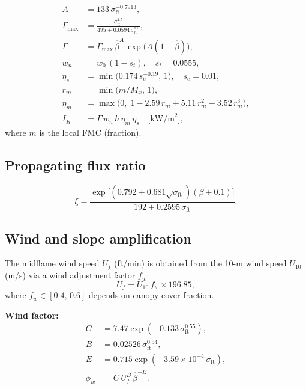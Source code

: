 \documentclass[11pt,twocolumn]{article}
\begin{document}
\begin{align}
  A &= 133\,\sigma_{\mathrm{ft}}^{-0.7913},\label{eq:A}\\
  \Gamma_{\max} &= \frac{\sigma_{\mathrm{ft}}^{1.5}}{495 + 0.0594\,\sigma_{\mathrm{ft}}^{1.5}},\label{eq:gammamax}\\
  \Gamma &= \Gamma_{\max}\,\hat{\beta}^{A}\,\exp\!\bigl(A(1-\hat{\beta})\bigr),\label{eq:gamma}\\
  w_n &= w_0\,(1 - s_t),\quad s_t = 0.0555,\label{eq:wn}\\
  \eta_s &= \min\!\bigl(0.174\,s_e^{-0.19},\,1\bigr),\quad s_e=0.01,\label{eq:etas}\\
  r_m &= \min\!\bigl(m/M_x,\,1\bigr),\label{eq:rm}\\
  \eta_m &= \max\!\bigl(0,\;1 - 2.59\,r_m + 5.11\,r_m^2 - 3.52\,r_m^3\bigr),\label{eq:etam}\\
  I_R &= \Gamma\,w_n\,h\,\eta_m\,\eta_s\quad\text{[kW/m}^2\text{]},\label{eq:IR}
\end{align}
where $m$ is the local FMC (fraction).

\subsection{Propagating flux ratio}

\begin{equation}
  \xi = \frac{\exp\!\bigl[(0.792+0.681\sqrt{\sigma_{\mathrm{ft}}})(\beta+0.1)\bigr]}
            {192 + 0.2595\,\sigma_{\mathrm{ft}}}.\label{eq:xi}
\end{equation}

\subsection{Wind and slope amplification}

The midflame wind speed $U_f$ (ft/min) is obtained from the 10-m
wind speed $U_{10}$ (m/s) via a wind adjustment factor $f_w$:
\begin{equation}
  U_f = U_{10}\,f_w\times 196.85,\label{eq:uf}
\end{equation}
where $f_w\in[0.4,\,0.6]$ depends on canopy cover fraction.

\textbf{Wind factor:}
\begin{align}
  C &= 7.47\exp(-0.133\,\sigma_{\mathrm{ft}}^{0.55}),\label{eq:C}\\
  B &= 0.02526\,\sigma_{\mathrm{ft}}^{0.54},\label{eq:B}\\
  E &= 0.715\exp(-3.59\times10^{-4}\,\sigma_{\mathrm{ft}}),\label{eq:E}\\
  \phi_w &= C\,U_f^B\,\hat{\beta}^{-E}.\label{eq:phiw}
\end{align}
\end{document}

